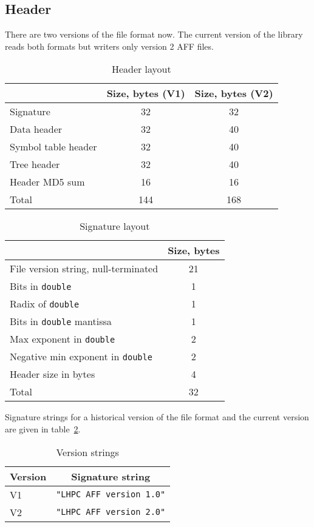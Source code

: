 \documentclass[10pt,letterpaper]{article}
\newcommand{\bc}{\begin{center}}
\newcommand{\ec}{\end{center}}
\newcommand{\ctext}[1]{\texttt{#1}}         %
\begin{document}
\subsection{Header}
There are two versions of the file format now. The current version of the
library reads both formats but writers only version 2 AFF files.
\begin{table}[h]
\bc
\caption{Header layout}\label{tab:header}
\begin{tabular}{|l|c|c|} \hline
 & Size, bytes (V1) & Size, bytes (V2)\\ \hline\hline
Signature & 32 & 32 \\ \hline
Data header & 32 & 40 \\ \hline
Symbol table header & 32 & 40 \\ \hline
Tree header & 32 & 40 \\ \hline
Header MD5 sum & 16 & 16 \\ \hline\hline
Total & 144 & 168 \\ \hline
\end{tabular}
\ec
\end{table}

\begin{table}[h]
\bc
\caption{Signature layout}\label{tab:signature}
\begin{tabular}{|l|c|} \hline
 & Size, bytes \\ \hline\hline
File version string, null-terminated &  21\\ \hline
Bits in \ctext{double} & 1 \\ \hline
Radix of \ctext{double} & 1 \\ \hline
Bits in \ctext{double} mantissa & 1 \\ \hline
Max exponent in \ctext{double} & 2 \\ \hline
Negative min exponent in \ctext{double} & 2 \\ \hline
Header size in bytes & 4 \\ \hline\hline
Total & 32 \\ \hline
\end{tabular}
\ec
\end{table}
Signature strings for a historical version of the file format and the
current version are given in table~\ref{tab:signature}.
\begin{table}[h]
\bc
\caption{Version strings}\label{tab:versions}
\begin{tabular}{|l|c|} \hline
 Version & Signature string \\ \hline\hline
 V1 & \verb|"LHPC AFF version 1.0"| \\ \hline
 V2 & \verb|"LHPC AFF version 2.0"| \\ \hline
\end{tabular}
\ec
\end{table}
\end{document}
